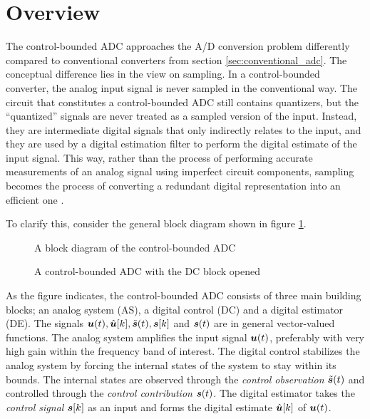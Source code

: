 \section{Overview}
The control-bounded ADC approaches the A/D conversion problem differently compared to conventional converters from section \ref{sec:conventional_adc}. The conceptual difference lies in the view on sampling. In a control-bounded converter, the analog input signal is never sampled in the conventional way. The circuit that constitutes a control-bounded ADC still contains quantizers, but the \enquote{quantized} signals are never treated as a sampled version of the input. Instead, they are intermediate digital signals that only indirectly relates to the input, and they are used by a digital estimation filter to perform the digital estimate of the input signal. This way, rather than the process of performing accurate measurements of an analog signal using imperfect circuit components, sampling becomes the process of converting a redundant digital representation into an efficient one \cite{malmberg_thesis}.

To clarify this, consider the general block diagram shown in figure \ref{fig:cbadc1}.
\begin{figure}[htbp]
    \centering
    
    \caption{A block diagram of the control-bounded ADC}
    \label{fig:cbadc1}
\end{figure}
\begin{figure}[htbp]
    \centering
    
    \caption{A control-bounded ADC with the DC block opened}
    \label{fig:cbadc2}
\end{figure}

As the figure indicates, the control-bounded ADC consists of three main building blocks; an analog system (AS), a digital control (DC) and a digital estimator (DE). The signals $\bm{u}(t), \hat{\bm{u}}[k], \tilde{\bm{s}}(t), \bm{s}[k]$ and $\bm{s}(t)$ are in general vector-valued functions. The analog system amplifies the input signal $\bm{u}(t)$, preferably with very high gain within the frequency band of interest. The digital control stabilizes the analog system by forcing the internal states of the system to stay within its bounds. The internal states are observed through the \textit{control observation} $\tilde{\bm{s}}(t)$ and controlled through the \textit{control contribution} $\bm{s}(t)$. The digital estimator takes the \textit{control signal} $\bm{s}[k]$ as an input and forms the digital estimate $\hat{\bm{u}}[k]$ of $\bm{u}(t)$.


